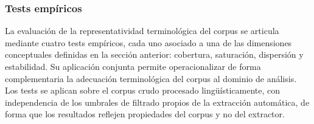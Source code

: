 \subsubsection{Tests empíricos}\label{subsubsec:tests-representatividad}

La evaluación de la representatividad terminológica del corpus se articula
mediante cuatro tests empíricos, cada uno asociado a una de las dimensiones
conceptuales definidas en la sección anterior: cobertura, saturación,
dispersión y estabilidad. Su aplicación conjunta permite operacionalizar
de forma complementaria la adecuación terminológica del corpus al dominio
de análisis. Los tests se aplican sobre el corpus crudo procesado
lingüísticamente, con independencia de los umbrales de filtrado propios
de la extracción automática, de forma que los resultados reflejen
propiedades del corpus y no del extractor.


